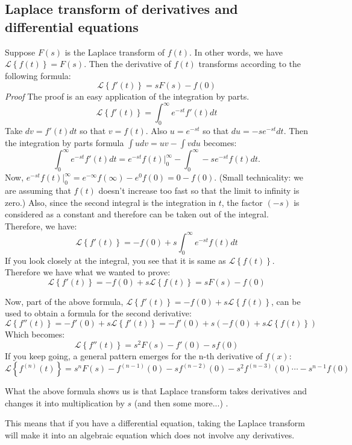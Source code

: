 \documentclass[12pt]{report}
\begin{document}
\subsection*{Laplace transform of derivatives and differential equations }

Suppose $F(s)$ is the Laplace transform of $f(t)$. In other words, we have $ \mathscr{L} \left\{f(t) \right\} = F(s)$. Then the derivative of $f(t)$ transforms according to the following formula:
$$ \mathscr{L} \left\{f'(t) \right\} = sF(s)-f(0)$$
\textit{Proof} The proof is an easy application of the integration by parts.
$$ \mathscr{L} \left\{f'(t) \right\} = \int_0^{\infty} e^{-st} f'(t) dt $$
Take $dv=f'(t)dt$ so that $v=f(t)$. Also $u= e^{-st}$ so that $du = -s e^{-st} dt$. Then the integration by parts formula $\int u dv = uv - \int v du $ becomes:
$$\int_0^{\infty} e^{-st} f'(t) dt = e^{-st} f(t) \Bigg\vert_0^{\infty} - \int_0^{\infty} -s e^{-st} f(t) dt. $$
Now, $e^{-st} f(t) \Bigg\vert_0^{\infty} = e^{-\infty}f(\infty) - e^0 f(0) =0-f(0)$. (Small technicality:  we are assuming that $f(t)$ doesn't increase too fast so that the limit to infinity is zero.) Also, since the second integral is the integration in $t$, the factor $(-s)$ is considered as a constant and therefore can be taken out of the integral. Therefore, we have:
$$ \mathscr{L} \left\{f'(t) \right\} = -f(0) + s \int_0^{\infty}  e^{-st} f(t) dt $$
If you look closely at the integral, you see that it is same as $ \mathscr{L} \left\{ f(t) \right\}$. Therefore we have what we wanted to prove:
$$ \mathscr{L} \left\{f'(t) \right\} = -f(0) + s \mathscr{L} \left\{ f(t) \right\} = s F(s) - f(0)$$

Now, part of the above formula, $ \mathscr{L} \left\{f'(t) \right\} = -f(0) + s \mathscr{L} \left\{ f(t) \right\}$, can be used to obtain a formula for the second derivative:
$$ \mathscr{L} \left\{f''(t) \right\} = -f'(0) + s \mathscr{L} \left\{ f'(t) \right\} =-f'(0) + s \left(-f(0) + s \mathscr{L} \left\{ f(t) \right\} \right)$$
Which becomes:
$$ \mathscr{L} \left\{f''(t) \right\} = s^2 F(s) -f'(0) - s f(0)$$
If you keep going, a general pattern emerges for the n-th derivative of $f(x)$:
$$ \mathscr{L} \left\{f^{(n)} (t) \right\} = s^n F(s) -f^{(n-1)}(0)-s f^{(n-2)}(0) -s^2 f^{(n-3)}(0) \cdots - s^{n-1} f(0)$$

What the above formula shows us is that Laplace transform takes derivatives and changes it into multiplication by $s$ (and then some more...) .

This means that if you have a differential equation, taking the Laplace transform will make it into an algebraic equation which does not involve any derivatives.
\end{document}
